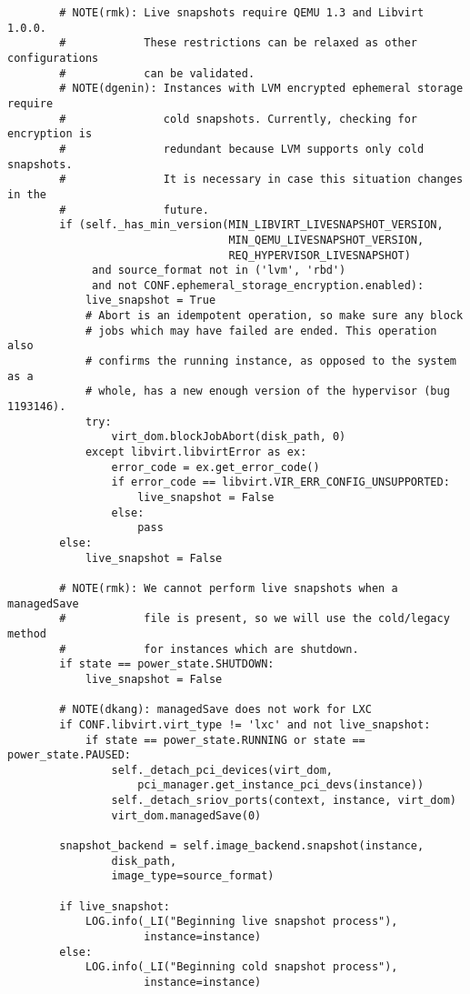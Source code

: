\documentclass[a4paper,left=1.5cm,right=1.5cm,11pt]{article}
\begin{document}
\begin{lstlisting}
        # NOTE(rmk): Live snapshots require QEMU 1.3 and Libvirt 1.0.0.
        #            These restrictions can be relaxed as other configurations
        #            can be validated.
        # NOTE(dgenin): Instances with LVM encrypted ephemeral storage require
        #               cold snapshots. Currently, checking for encryption is
        #               redundant because LVM supports only cold snapshots.
        #               It is necessary in case this situation changes in the
        #               future.
        if (self._has_min_version(MIN_LIBVIRT_LIVESNAPSHOT_VERSION,
                                  MIN_QEMU_LIVESNAPSHOT_VERSION,
                                  REQ_HYPERVISOR_LIVESNAPSHOT)
             and source_format not in ('lvm', 'rbd')
             and not CONF.ephemeral_storage_encryption.enabled):
            live_snapshot = True
            # Abort is an idempotent operation, so make sure any block
            # jobs which may have failed are ended. This operation also
            # confirms the running instance, as opposed to the system as a
            # whole, has a new enough version of the hypervisor (bug 1193146).
            try:
                virt_dom.blockJobAbort(disk_path, 0)
            except libvirt.libvirtError as ex:
                error_code = ex.get_error_code()
                if error_code == libvirt.VIR_ERR_CONFIG_UNSUPPORTED:
                    live_snapshot = False
                else:
                    pass
        else:
            live_snapshot = False

        # NOTE(rmk): We cannot perform live snapshots when a managedSave
        #            file is present, so we will use the cold/legacy method
        #            for instances which are shutdown.
        if state == power_state.SHUTDOWN:
            live_snapshot = False

        # NOTE(dkang): managedSave does not work for LXC
        if CONF.libvirt.virt_type != 'lxc' and not live_snapshot:
            if state == power_state.RUNNING or state == power_state.PAUSED:
                self._detach_pci_devices(virt_dom,
                    pci_manager.get_instance_pci_devs(instance))
                self._detach_sriov_ports(context, instance, virt_dom)
                virt_dom.managedSave(0)

        snapshot_backend = self.image_backend.snapshot(instance,
                disk_path,
                image_type=source_format)

        if live_snapshot:
            LOG.info(_LI("Beginning live snapshot process"),
                     instance=instance)
        else:
            LOG.info(_LI("Beginning cold snapshot process"),
                     instance=instance)


\end{lstlisting}
\end{document}
